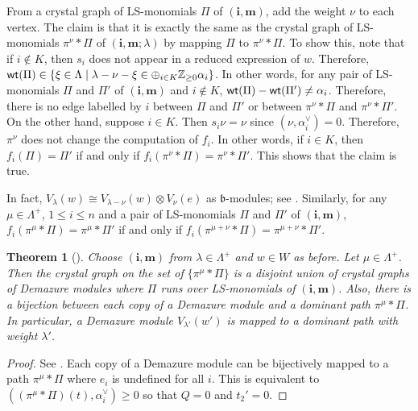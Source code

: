 \documentclass[12pt]{amsart}
\newtheorem{theorem}{Theorem}[section]
\theoremstyle{definition}
\theoremstyle{remark}
\newcommand{\Z}{\mathbb{Z}}
\begin{document}
From a crystal graph of LS-monomials $\Pi$ of $(\mathbf{i} , \mathbf{m})$, add the weight $\nu$ to each vertex. The claim is that it is exactly the same as the crystal graph of LS-monomials $\pi^\nu * \Pi$ of $(\mathbf{i} , \mathbf{m}; \lambda)$ by mapping $\Pi$ to $\pi^\nu * \Pi$. To show this, note that if $i \notin K$, then $s_i$ does not appear in a reduced expression of $w$. Therefore, ${\sf wt}(\Pi) \in \{ \xi \in \Lambda \mid \lambda - \nu - \xi \in \oplus_{i \in K} \Z_{\geq 0} \alpha_i \}$. In other words, for any pair of LS-monomials $\Pi$ and $\Pi'$ of $(\mathbf{i} , \mathbf{m})$ and $i \notin K$, ${\sf wt}(\Pi) - {\sf wt}(\Pi') \neq \alpha_i$. Therefore, there is no edge labelled by $i$ between $\Pi$ and $\Pi'$ or between $\pi^\nu * \Pi$ and $\pi^\nu *\Pi'$. On the other hand, suppose $i \in K$. Then $s_i \nu = \nu$ since $(\nu , \alpha_i^\vee ) = 0$. Therefore, $\pi^\nu$ does not change the computation of $f_i$. In other words, if $i \in K$, then $f_i (\Pi) = \Pi'$ if and only if $f_i (\pi^\nu * \Pi) = \pi^\nu * \Pi'$. This shows that the claim is true.

In fact, $V_{\lambda}(w) \cong V_{\lambda - \nu}(w) \otimes V_\nu (e)$ as $\mathfrak{b}$-modules; see \cite[\S 1.1]{MR1887117}. Similarly, for any $\mu \in \Lambda^+$, $1 \leq i \leq n$ and a pair of LS-monomials $\Pi$ and $\Pi'$ of $(\mathbf{i} , \mathbf{m})$, $f_i (\pi^\mu * \Pi) = \pi^\mu * \Pi'$ if and only if $f_i(\pi^{\mu  + \nu} * \Pi) = \pi^{\mu + \nu} * \Pi'$.

\begin{theorem}[{\cite[Theorem 2]{MR1887117}}]\label{thm3.3}
Choose $(\mathbf{i} , \mathbf{m})$ from $\lambda \in \Lambda^+$ and $w \in W$ as before. Let $\mu \in \Lambda^+$. Then the crystal graph on the set of $\{\pi^\mu * \Pi \}$ is a disjoint union of crystal graphs of Demazure modules where $\Pi$ runs over LS-monomials of $(\mathbf{i} , \mathbf{m})$. Also, there is a bijection between each copy of a Demazure module and a dominant path $\pi^\mu * \Pi $. In particular, a Demazure module $V_{\lambda'} (w')$ is mapped to a dominant path with weight $\lambda'$.
\end{theorem}
\begin{proof}
See \cite[Proposition 12]{MR1887117}. Each copy of a Demazure module can be bijectively mapped to a path $\pi^\mu * \Pi $ where $e_i $ is undefined for all $i$. This is equivalent to $( (\pi^\mu * \Pi)(t) , \alpha_i^\vee ) \geq 0$ so that $Q = 0$ and $t_2 ' =0$.
\end{proof}
\end{document}
